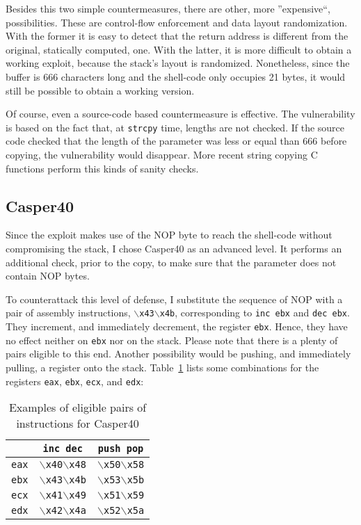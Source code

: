 Besides this two simple countermeasures, there are other, more ''expensive``, possibilities. These are control-flow enforcement and data layout randomization. With the former it is easy to detect that the return address is different from the original, statically computed, one. With the latter, it is more difficult to obtain a working exploit, because the stack's layout is randomized. Nonetheless, since the buffer is 666 characters long and the shell-code only occupies 21 bytes, it would still be possible to obtain a working version.

Of course, even a source-code based countermeasure is effective. The vulnerability is based on the fact that, at \texttt{strcpy} time, lengths are not checked. If the source code checked that the length of the parameter was less or equal than 666 before copying, the vulnerability would disappear. More recent string copying C functions perform this kinds of sanity checks.

\subsection{Casper40}\label{sec:casper40}
Since the exploit makes use of the NOP byte to reach the shell-code without compromising the stack, I chose Casper40 as an advanced level. It performs an additional check, prior to the copy, to make sure that the parameter does not contain NOP bytes. 

To counterattack this level of defense, I substitute the sequence of NOP with a pair of assembly instructions, \texttt{$\backslash$x43$\backslash$x4b}, corresponding to \texttt{inc ebx} and \texttt{dec ebx}. They increment, and immediately decrement, the register \texttt{ebx}. Hence, they have no effect neither on \texttt{ebx} nor on the stack. Please note that there is a plenty of pairs eligible to this end. Another possibility would be pushing, and immediately pulling, a register onto the stack. Table~\ref{tbl:casper40} lists some combinations for the registers \texttt{eax}, \texttt{ebx}, \texttt{ecx}, and \texttt{edx}:
\begin{table}[h]
	\centering
	\begin{tabular}{|c|c|c|}
		\hline
		& \texttt{inc dec}                        & \texttt{push pop}                       \\ \hline
		\texttt{eax} & \texttt{$\backslash$x40$\backslash$x48} & \texttt{$\backslash$x50$\backslash$x58} \\ \hline
		\texttt{ebx} & \texttt{$\backslash$x43$\backslash$x4b} & \texttt{$\backslash$x53$\backslash$x5b} \\ \hline
		\texttt{ecx} & \texttt{$\backslash$x41$\backslash$x49} & \texttt{$\backslash$x51$\backslash$x59} \\ \hline
		\texttt{edx} & \texttt{$\backslash$x42$\backslash$x4a} & \texttt{$\backslash$x52$\backslash$x5a} \\ \hline
	\end{tabular}
	\caption{Examples of eligible pairs of instructions for Casper40}
	\label{tbl:casper40}
\end{table}

